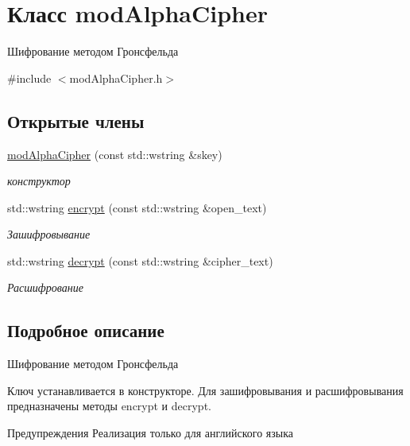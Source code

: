 \hypertarget{classmodAlphaCipher}{}\section{Класс mod\+Alpha\+Cipher}
\label{classmodAlphaCipher}


Шифрование методом Гронсфельда  




{\ttfamily \#include $<$mod\+Alpha\+Cipher.\+h$>$}

\subsection*{Открытые члены}
\begin{DoxyCompactItemize}
\item 
\hyperlink{classmodAlphaCipher_a314fca132f4e74faca280b7c1fad7cb5}{mod\+Alpha\+Cipher} (const std\+::wstring \&skey)
\begin{DoxyCompactList}\small\item\em конструктор \end{DoxyCompactList}\item 
std\+::wstring \hyperlink{classmodAlphaCipher_a5edc499881373a275a3cd14f0cab6c19}{encrypt} (const std\+::wstring \&open\+\_\+text)
\begin{DoxyCompactList}\small\item\em Зашифровывание \end{DoxyCompactList}\item 
std\+::wstring \hyperlink{classmodAlphaCipher_a941eab79d9ec1a8de4e1f9cf2a80ff35}{decrypt} (const std\+::wstring \&cipher\+\_\+text)
\begin{DoxyCompactList}\small\item\em Расшифрование \end{DoxyCompactList}\end{DoxyCompactItemize}


\subsection{Подробное описание}
Шифрование методом Гронсфельда 

Ключ устанавливается в конструкторе. Для зашифровывания и расшифровывания предназначены методы encrypt и decrypt. \begin{DoxyWarning}{Предупреждения}
Реализация только для английского языка 
\end{DoxyWarning}


